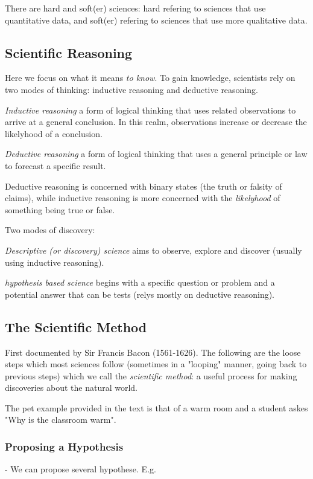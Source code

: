 \documentclass{article}
\theoremstyle{definition}
\begin{document}
There are hard and soft(er) sciences: hard refering to sciences that use quantitative data, and soft(er) refering to sciences that use more qualitative data.

\subsection{Scientific Reasoning}
Here we focus on what it means \textit{to know}. To gain knowledge, scientists rely on two modes of thinking: inductive reasoning and deductive reasoning.

 \textit{Inductive reasoning}
a form of logical thinking that uses related observations to arrive at a general conclusion. In this realm, observations increase or decrease the likelyhood of a conclusion.

 \textit{Deductive reasoning}
a form of logical thinking that uses a general principle or law to forecast a specific result.

Deductive reasoning is concerned with binary states (the truth or falsity of claims), while inductive reasoning is more concerned with the \textit{likelyhood} of something being true or false.

Two modes of discovery:

 \textit{Descriptive (or discovery) science}
aims to observe, explore and discover (usually using inductive reasoning).

 \textit{hypothesis based science}
begins with a specific question or problem and a potential answer that can be tests (relys mostly on deductive reasoning).

\subsection{The Scientific Method}
First documented by Sir Francis Bacon (1561-1626). The following are the loose steps which most sciences follow (sometimes in a "looping" manner, going back to previous steps) which we call the \textit{scientific method}: a useful process for making discoveries about the natural world.

The pet example provided in the text is that of a warm room and a student askes "Why is the classroom warm".

\subsubsection{Proposing a Hypothesis}
\indent- We can propose several hypothese. E.g.
\end{document}
